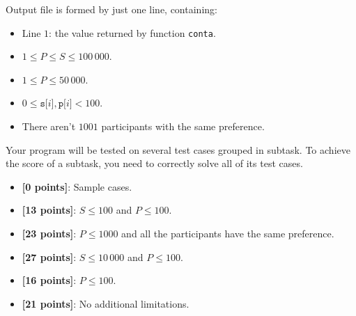 Output file is formed by just one line, containing:
\begin{itemize}[nolistsep,itemsep=2mm]
\item Line $1$: the value returned by function \texttt{conta}.
\end{itemize}



\Constraints

\begin{itemize}[nolistsep, itemsep=2mm]
	\item $1 \le P \le S \le 100\,000$.
	\item $1 \le P \le 50\,000$.
	\item $0 \le \texttt{s[$i$]}, \texttt{p[$i$]} < 100$.
	\item There aren't $1001$ participants with the same preference.
\end{itemize}



\Scoring

Your program will be tested on several test cases grouped in subtask. To
achieve the score of a subtask, you need to correctly solve all of its test cases.

\begin{itemize}[nolistsep,itemsep=2mm]
  \item \textbf{ [\phantom{1}0 points]}: Sample cases.
  \item \textbf{ [13 points]}: $S \leq 100$ and $P\le 100$. %
  \item \textbf{ [23 points]}: $P\le 1000$ and all the participants have the same preference.
  \item \textbf{ [27 points]}: $S \leq 10\,000$ and $P \le 100$. %
  \item \textbf{ [16 points]}: $P\le 100$. %
  \item \textbf{ [21 points]}: No additional limitations. %
\end{itemize}



